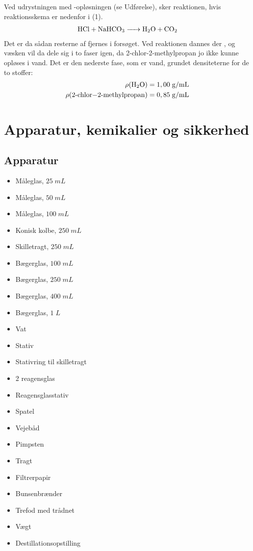 \documentclass{report}
\begin{document}
Ved udrystningen med -opløsningen (se Udførelse), sker reaktionen, hvis reaktionsskema er nedenfor i (1).
\begin{equation}
\begin{split}
  \ce{HCl + NaHCO3 -> H2O + CO2}
\end{split}
\end{equation}
Det er da sådan resterne af  fjernes i forsøget.
Ved reaktionen dannes der , og væsken vil da dele sig i to faser igen, da 2-chlor-2-methylpropan jo ikke kunne opløses i vand. 
Det er den nederste fase, som er vand, grundet densiteterne for de to stoffer:
\begin{equation*}
\begin{split}
  \rho(\ce{H2O}) &= 1,00 \;\unit{g/mL} \\ 
  \rho(\ce{2-chlor-2-methylpropan}) &= 0,85 \;\unit{g/mL} 
\end{split}
\end{equation*}

\section*{Apparatur, kemikalier og sikkerhed}%
  \label{sec:Apparatur, kemikalier og sikkerhed}
\subsection*{Apparatur}%
  \label{sub:Apparatur}
 \begin{itemize}
  \item Måleglas, $25 \;\unit{mL} $ 
\item Måleglas, $50 \;\unit{mL} $ 
\item Måleglas, $100 \;\unit{mL} $ 
  \item Konisk kolbe, $250 \;\unit{mL} $ 
  \item Skilletragt, $250 \;\unit{mL} $ 
  \item Bægerglas, $100 \;\unit{mL} $ 
\item  Bægerglas, $250 \;\unit{mL} $ 
\item  Bægerglas, $400 \;\unit{mL} $ 
\item  Bægerglas, $1 \;\unit{L} $ 
\item Vat
\item Stativ 
\item Stativring til skilletragt 
\item 2 reagensglas 
\item Reagensglasstativ 
\item Spatel 
\item Vejebåd 
\item Pimpsten 
\item Tragt 
\item Filtrerpapir 
\item Bunsenbrænder 
\item Trefod med trådnet 
\item Vægt 
   \item Destillationsopstilling  
 \end{itemize} 
\end{document}
